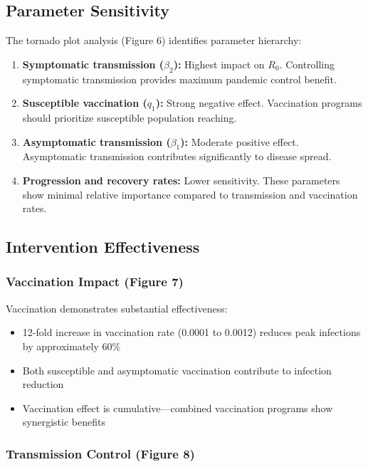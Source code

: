 \documentclass[12pt,a4paper]{report}
\begin{document}
\subsection{Parameter Sensitivity}

The tornado plot analysis (Figure 6) identifies parameter hierarchy:

\begin{enumerate}
    \item \textbf{Symptomatic transmission ($\beta_2$):} Highest impact on $R_0$. Controlling symptomatic transmission provides maximum pandemic control benefit.
    
    \item \textbf{Susceptible vaccination ($q_1$):} Strong negative effect. Vaccination programs should prioritize susceptible population reaching.
    
    \item \textbf{Asymptomatic transmission ($\beta_1$):} Moderate positive effect. Asymptomatic transmission contributes significantly to disease spread.
    
    \item \textbf{Progression and recovery rates:} Lower sensitivity. These parameters show minimal relative importance compared to transmission and vaccination rates.
\end{enumerate}

\subsection{Intervention Effectiveness}

\subsubsection{Vaccination Impact (Figure 7)}

Vaccination demonstrates substantial effectiveness:
\begin{itemize}
    \item 12-fold increase in vaccination rate (0.0001 to 0.0012) reduces peak infections by approximately 60\%
    \item Both susceptible and asymptomatic vaccination contribute to infection reduction
    \item Vaccination effect is cumulative—combined vaccination programs show synergistic benefits
\end{itemize}

\subsubsection{Transmission Control (Figure 8)}
\end{document}
